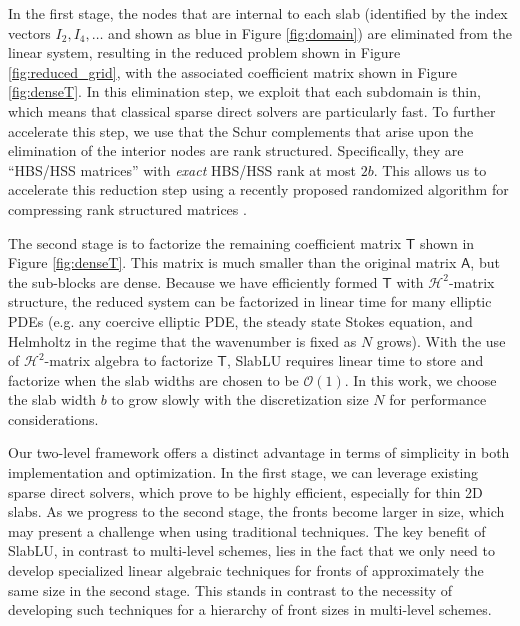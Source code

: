 \documentclass[10pt,a4paper]{amsart}
\newcommand{\mtx}[1]{\bm{\mathsf{#1}}}
\begin{document}
In the first stage, the nodes that are internal to each slab 
(identified by the index vectors $I_2, I_4, \dots$ and shown as 
blue in Figure \ref{fig:domain}) are eliminated from the linear system, resulting in the reduced problem shown in
Figure \ref{fig:reduced_grid}, with the associated coefficient matrix shown
in Figure \ref{fig:denseT}. 
In this elimination step, we exploit that each subdomain is thin, which 
means that classical sparse direct solvers are particularly fast. 
To further accelerate this step, we use that the Schur complements that arise upon
the elimination of the interior nodes are rank structured. 
Specifically, they are ``HBS/HSS matrices'' \cite{2012_martinsson_FDS_survey,2013_efficient_FDS,2010_xia}
with \textit{exact} HBS/HSS rank at most $2b$. 
This allows us to accelerate this reduction step using a recently proposed 
randomized algorithm for 
compressing rank structured matrices \cite{levitt2024linear}.

The second stage is to factorize the remaining coefficient matrix $\mtx{T}$
shown in Figure \ref{fig:denseT}. This matrix is much smaller than the original
matrix $\mtx{A}$, but the sub-blocks are dense. Because we have efficiently formed
$\mtx T$ with $\mathcal H^2$-matrix structure, the reduced system can be
factorized in linear time for many elliptic PDEs (e.g. any coercive elliptic PDE, the steady state Stokes equation, and Helmholtz in the regime that the wavenumber is fixed as $N$ grows). 
With the use of $\mathcal H^2$-matrix algebra to factorize $\mtx T$, SlabLU requires linear time to 
store and factorize when the slab widths are chosen to be $\mathcal O(1)$.
In this work, we choose the slab width $b$ to grow slowly with the discretization size $N$
for performance considerations.

Our two-level framework offers a distinct advantage in terms of simplicity in both implementation and optimization. In the first stage,
we can leverage existing sparse direct solvers, which prove to be highly efficient, especially for thin 2D slabs. 
As we progress to the second stage, the fronts become larger in size, which may present a challenge when using traditional techniques.
The key benefit of SlabLU, in contrast to multi-level schemes, lies in the fact that we only need to develop specialized linear 
algebraic techniques for fronts of approximately the same size in the second stage. 
This stands in contrast to the necessity of developing such techniques for a hierarchy of front sizes in multi-level schemes.
\end{document}

